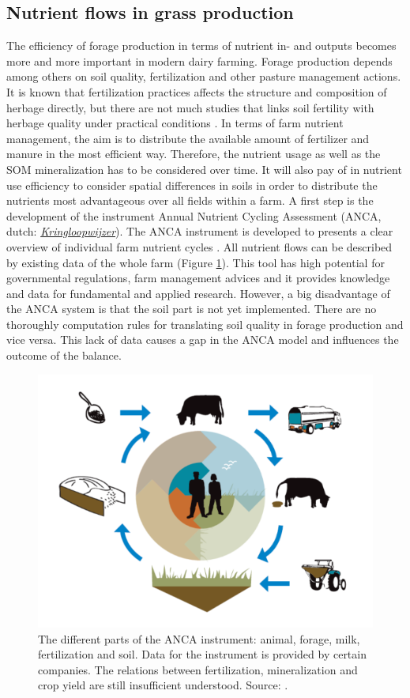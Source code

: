 \documentclass[10pt,twoside,dutch,english]{report}
\begin{document}
			
		\subsection{Nutrient flows in grass production}
		The efficiency of forage production in terms of nutrient in- and outputs becomes more and more important in modern dairy farming. Forage production depends among others on soil quality, fertilization and other pasture management actions. It is known that fertilization practices affects the structure and composition of herbage directly, but there are not much studies that links soil fertility with herbage quality under practical conditions \citep{Reijneveld2014}. In terms of farm nutrient management, the aim is to distribute the available amount of fertilizer and manure in the most efficient way. Therefore, the nutrient usage as well as the SOM mineralization has to be considered over time. It will also pay of in nutrient use efficiency to consider spatial differences in soils in order to distribute the nutrients most advantageous over all fields within a farm.  A first step is the development of the instrument Annual Nutrient Cycling Assessment (ANCA, dutch: 	\href{http://www.wageningenur.nl/nl/show/KringloopWijzer-2.htm}{\textit{Kringloopwijzer}}). The ANCA instrument is developed to presents a clear overview of individual farm nutrient cycles \citep{Aarts2013}. All nutrient flows can be described by existing data of the whole farm (Figure \ref{fig:KLW}). This tool has high potential for governmental regulations, farm management advices and it provides knowledge and data for fundamental and applied research. However, a big disadvantage of the ANCA system is that the soil part is not yet implemented. There are no thoroughly computation rules for translating soil quality in forage production and vice versa. This lack of data causes a gap in the ANCA model and influences the outcome of the balance. 
		
		\begin{figure}[ht]
			\centering
			\includegraphics[width=0.6\linewidth]{intro_KLW}
			\caption{The different parts of the ANCA instrument: animal, forage, milk, fertilization and soil. Data for the instrument is provided by certain companies. The relations between fertilization, mineralization and crop yield are still insufficient understood. Source: \citet{Holster2013}. }
			\label{fig:KLW}
		\end{figure}
		
\end{document}
